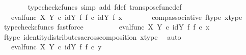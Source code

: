 \begin{isabellebody}
\ \ \ \ \ \ \isamarkupfalse%
\ {\isacharparenleft}{\kern0pt}typecheck{\isacharunderscore}{\kern0pt}cfuncs{\isacharcomma}{\kern0pt}\ simp\ add{\isacharcolon}{\kern0pt}\ f{\isacharunderscore}{\kern0pt}def\ transpose{\isacharunderscore}{\kern0pt}func{\isacharunderscore}{\kern0pt}def{\isacharparenright}{\kern0pt}\isanewline
\ \ \ \ \isamarkupfalse%
\ \isamarkupfalse%
\ {\isachardoublequoteopen}{\isachardot}{\kern0pt}{\isachardot}{\kern0pt}{\isachardot}{\kern0pt}\ {\isacharequal}{\kern0pt}\ {\isacharparenleft}{\kern0pt}eval{\isacharunderscore}{\kern0pt}func\ X\ Y{\isacharparenright}{\kern0pt}\ {\isasymcirc}\isactrlsub c\ {\isacharparenleft}{\kern0pt}{\isacharparenleft}{\kern0pt}id{\isacharparenleft}{\kern0pt}Y{\isacharparenright}{\kern0pt}\ {\isasymtimes}\isactrlsub f\ f{\isacharparenright}{\kern0pt}\ {\isasymcirc}\isactrlsub c\ {\isacharparenleft}{\kern0pt}id{\isacharparenleft}{\kern0pt}Y{\isacharparenright}{\kern0pt}\ {\isasymtimes}\isactrlsub f\ x{\isacharparenright}{\kern0pt}{\isacharparenright}{\kern0pt}{\isachardoublequoteclose}\isanewline
\ \ \ \ \ \ \isamarkupfalse%
\ comp{\isacharunderscore}{\kern0pt}associative{}\ f{\isacharunderscore}{\kern0pt}type\ x{\isacharunderscore}{\kern0pt}type{}\ \isamarkupfalse%
\ {\isacharparenleft}{\kern0pt}typecheck{\isacharunderscore}{\kern0pt}cfuncs{\isacharcomma}{\kern0pt}\ fastforce{\isacharparenright}{\kern0pt}\isanewline
\ \ \ \ \isamarkupfalse%
\ \isamarkupfalse%
\ {\isachardoublequoteopen}{\isachardot}{\kern0pt}{\isachardot}{\kern0pt}{\isachardot}{\kern0pt}\ {\isacharequal}{\kern0pt}\ {\isacharparenleft}{\kern0pt}eval{\isacharunderscore}{\kern0pt}func\ X\ Y{\isacharparenright}{\kern0pt}\ {\isasymcirc}\isactrlsub c\ {\isacharparenleft}{\kern0pt}id{\isacharparenleft}{\kern0pt}Y{\isacharparenright}{\kern0pt}\ {\isasymtimes}\isactrlsub f\ {\isacharparenleft}{\kern0pt}f\ {\isasymcirc}\isactrlsub c\ x{\isacharparenright}{\kern0pt}{\isacharparenright}{\kern0pt}{\isachardoublequoteclose}\isanewline
\ \ \ \ \ \ \isamarkupfalse%
\ f{\isacharunderscore}{\kern0pt}type\ identity{\isacharunderscore}{\kern0pt}distributes{\isacharunderscore}{\kern0pt}across{\isacharunderscore}{\kern0pt}composition\ x{\isacharunderscore}{\kern0pt}type{}\ \isamarkupfalse%
\ auto\isanewline
\ \ \ \ \isamarkupfalse%
\ \isamarkupfalse%
\ {\isachardoublequoteopen}{\isachardot}{\kern0pt}{\isachardot}{\kern0pt}{\isachardot}{\kern0pt}\ {\isacharequal}{\kern0pt}\ {\isacharparenleft}{\kern0pt}eval{\isacharunderscore}{\kern0pt}func\ X\ Y{\isacharparenright}{\kern0pt}\ {\isasymcirc}\isactrlsub c\ {\isacharparenleft}{\kern0pt}id{\isacharparenleft}{\kern0pt}Y{\isacharparenright}{\kern0pt}\ {\isasymtimes}\isactrlsub f\ {\isacharparenleft}{\kern0pt}f\ {\isasymcirc}\isactrlsub c\ y{\isacharparenright}{\kern0pt}{\isacharparenright}{\kern0pt}{\isachardoublequoteclose}\isanewline

\end{isabellebody}
